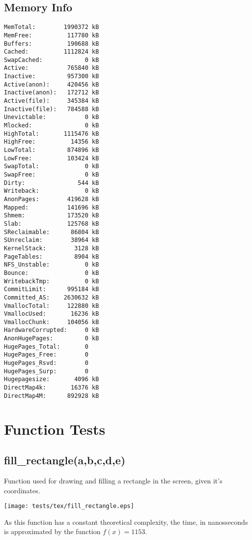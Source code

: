 \documentclass{article}
\begin{document}
\subsection{Memory Info}
\begin{verbatim}
MemTotal:        1990372 kB
MemFree:          117780 kB
Buffers:          190688 kB
Cached:          1112824 kB
SwapCached:            0 kB
Active:           765840 kB
Inactive:         957300 kB
Active(anon):     420456 kB
Inactive(anon):   172712 kB
Active(file):     345384 kB
Inactive(file):   784588 kB
Unevictable:           0 kB
Mlocked:               0 kB
HighTotal:       1115476 kB
HighFree:          14356 kB
LowTotal:         874896 kB
LowFree:          103424 kB
SwapTotal:             0 kB
SwapFree:              0 kB
Dirty:               544 kB
Writeback:             0 kB
AnonPages:        419628 kB
Mapped:           141696 kB
Shmem:            173520 kB
Slab:             125768 kB
SReclaimable:      86804 kB
SUnreclaim:        38964 kB
KernelStack:        3128 kB
PageTables:         8904 kB
NFS_Unstable:          0 kB
Bounce:                0 kB
WritebackTmp:          0 kB
CommitLimit:      995184 kB
Committed_AS:    2630632 kB
VmallocTotal:     122880 kB
VmallocUsed:       16236 kB
VmallocChunk:     104056 kB
HardwareCorrupted:     0 kB
AnonHugePages:         0 kB
HugePages_Total:       0
HugePages_Free:        0
HugePages_Rsvd:        0
HugePages_Surp:        0
Hugepagesize:       4096 kB
DirectMap4k:       16376 kB
DirectMap4M:      892928 kB
\end{verbatim}
\section{Function Tests}
\subsection{fill\_rectangle(a,b,c,d,e)}
Function used for drawing and filling a rectangle in the
screen, given it's coordinates. 

\texttt{[image: tests/tex/fill\_rectangle.eps]}

As this function has a constant theoretical
complexity, the time, in nanosseconds is 
approximated by the function $f(x)=1153$.
\end{document}
